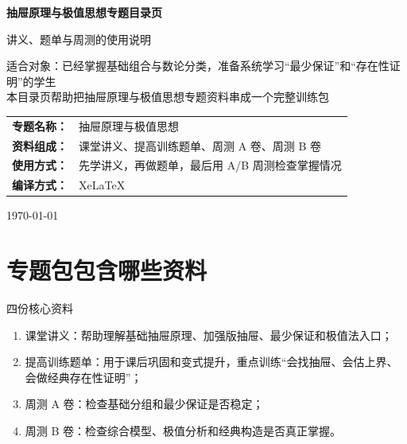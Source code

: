 \documentclass[11pt,a4paper,fontset=fandol]{ctexart}
\begin{document}
\thispagestyle{empty}
\begin{titlepage}
\centering
\vspace*{0.9cm}

\begin{tcolorbox}[
  enhanced,
  width=0.92\textwidth,
  colback=white,
  colframe=mainblue,
  boxrule=1pt,
  arc=0mm,
  left=6mm,
  right=6mm,
  top=8mm,
  bottom=8mm
]
\centering

{\fontsize{24}{30}\selectfont\bfseries 抽屉原理与极值思想专题目录页\par}
\vspace{0.65cm}
{\fontsize{17}{22}\selectfont 讲义、题单与周测的使用说明\par}

\vspace{1cm}
\begin{tcolorbox}[colback=lightblue,colframe=mainblue,width=0.84\textwidth,boxrule=1pt]
\centering
{\large 适合对象：已经掌握基础组合与数论分类，准备系统学习“最少保证”和“存在性证明”的学生}\\[0.35em]
{\normalsize 本目录页帮助把抽屉原理与极值思想专题资料串成一个完整训练包}
\end{tcolorbox}

\vspace{1.0cm}
\renewcommand{\arraystretch}{1.42}
\begin{tabular}{>{\bfseries}p{3.5cm}p{8cm}}
专题名称： & 抽屉原理与极值思想 \\
资料组成： & 课堂讲义、提高训练题单、周测 A 卷、周测 B 卷 \\
使用方式： & 先学讲义，再做题单，最后用 A/B 周测检查掌握情况 \\
编译方式： & XeLaTeX \\
\end{tabular}

\vspace{0.9cm}
{\large \today\par}
\end{tcolorbox}
\end{titlepage}

\tableofcontents
\newpage

\section{专题包包含哪些资料}

\begin{goalbox}{四份核心资料}
\begin{enumerate}
  \item 课堂讲义：帮助理解基础抽屉原理、加强版抽屉、最少保证和极值法入口；
  \item 提高训练题单：用于课后巩固和变式提升，重点训练“会找抽屉、会估上界、会做经典存在性证明”；
  \item 周测 A 卷：检查基础分组和最少保证是否稳定；
  \item 周测 B 卷：检查综合模型、极值分析和经典构造是否真正掌握。
\end{enumerate}
\end{goalbox}
\end{document}
